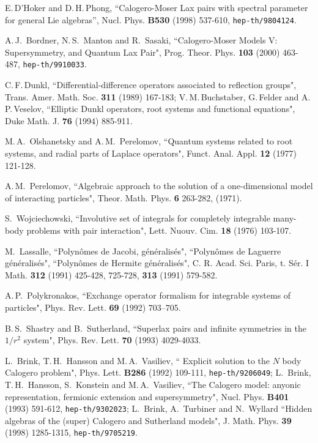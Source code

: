 \documentclass[a4paper,12pt]{article}
\begin{document}
\begin{thebibliography}{99}
E.\,D'Hoker and D.\,H.\,Phong, ``Calogero-Moser
Lax pairs with spectral parameter for general Lie algebras'',
Nucl. Phys. {\bf B530} (1998) 537-610, {\tt hep-th/9804124}.

  A.\,J.\, Bordner, N.\,S.\, Manton and R.\, Sasaki,
``Calogero-Moser Models V:  Supersymmetry,
and Quantum Lax Pair", Prog. Theor. Phys. {\bf 103} (2000) 463-487,
{\tt hep-th/9910033}.

C.\,F.\,Dunkl, ``Differential-difference operators associated to
reflection groups", Trans. Amer. Math. Soc. {\bf 311} (1989) 167-183;
V.\,M.\,Buchstaber, G.\,Felder and A.\,P.\,Veselov,
``Elliptic Dunkl operators, root systems and functional equations",
Duke Math. J. {\bf 76} (1994) 885-911.

M.\,A.\, Olshanetsky and A.\,M.\, Perelomov, ``Quantum systems
related to root systems, and radial parts of Laplace operators",
Funct. Anal. Appl. {\bf 12} (1977) 121-128.

A.\,M.\, Perelomov, ``Algebraic approach to the solution of a
one-dimensional model of interacting particles",
Theor. Math. Phys. {\bf 6} 263-282, (1971).

S.\, Wojciechowski, ``Involutive set of integrals for completely
integrable many-body problems with pair interaction",
Lett. Nuouv. Cim. {\bf 18} (1976) 103-107.

M.\, Lassalle, ``Polyn\^{o}mes de Jacobi,
g\'{e}n\'{e}ralis\'{e}s",  ``Polyn\^{o}mes de Laguerre
g\'{e}n\'{e}ralis\'{e}s", ``Polyn\^{o}mes de Hermite
g\'{e}n\'{e}ralis\'{e}s",  C. R. Acad. Sci. Paris, t. S\'er. I Math. {\bf
312} (1991) 425-428, 725-728, {\bf 313} (1991) 579-582.

A.\,P.\, Polykronakos, ``Exchange operator formalism for
integrable systems of particles",
Phys. Rev. Lett. {\bf 69} (1992)
703--705.

B.\,S.\, Shastry and B.\, Sutherland, ``Superlax pairs and infinite
symmetries
in the \(1/r^2\) system", Phys. Rev. Lett. {\bf 70} (1993) 4029-4033.

L.\, Brink, T.\,H.\, Hansson and M.\,A.\, Vasiliev, `` Explicit solution
to
the \(N\) body Calogero problem", Phys. Lett. {\bf B286} (1992) 109-111,
{\tt hep-th/9206049};
L.\, Brink, T.\,H.\, Hansson, S.\, Konstein and M.\,A.\, Vasiliev,
``The Calogero model: anyonic representation, fermionic extension and
supersymmetry", Nucl. Phys. {\bf B401} (1993) 591-612,
{\tt hep-th/9302023};
L.\, Brink, A.\, Turbiner and N.\, Wyllard ``Hidden algebras of the
(super) Calogero and Sutherland models", J. Math. Phys. {\bf 39} (1998)
1285-1315,  {\tt hep-th/9705219}.


\end{thebibliography}
\end{document}
